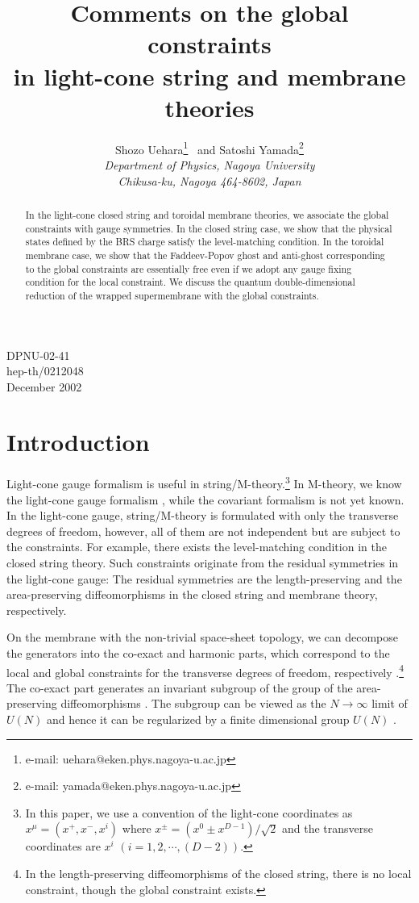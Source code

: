 \documentclass[12pt,a4paper]{article}
\title{Comments on the global constraints\\
in light-cone string and membrane theories}
\author{{\sc Shozo Uehara}\footnote{e-mail:
uehara@eken.phys.nagoya-u.ac.jp}~ and
{\sc Satoshi Yamada}\footnote{e-mail:
yamada@eken.phys.nagoya-u.ac.jp}\vspace{4mm}\\
{\sl Department of Physics, Nagoya University}\\
{\sl Chikusa-ku, Nagoya 464-8602, Japan}}
\date{}
\begin{document}
\maketitle
\vspace{-80mm}
\begin{flushright}
DPNU-02-41\\
hep-th/0212048\\
December 2002
\end{flushright}
\vspace{57mm}


\begin{abstract}
In the light-cone closed string and toroidal membrane theories,
we associate the global constraints with gauge symmetries.
In the closed string case, we show that the physical states defined by
the BRS charge satisfy the level-matching condition.
In the toroidal membrane case, we show that the Faddeev-Popov ghost and
anti-ghost corresponding to the global constraints are essentially
free even if we adopt any gauge fixing condition for the local
constraint. We discuss the quantum double-dimensional reduction of the
wrapped supermembrane with the global constraints.
\end{abstract}

\section{Introduction}
Light-cone gauge formalism is useful in string/M-theory.\footnote{In
this paper, we use a convention of the light-cone coordinates as
$x^\mu=(x^{+},x^{-},x^i)$ where $x^{\pm}=(x^0 \pm x^{D-1})/\sqrt{2}$
and the transverse coordinates are $x^i$ $(i=1,2,\cdots,(D-2))$. }
In M-theory, we know the light-cone gauge formalism \cite{BFSS},
while the covariant formalism is not yet known.
In the light-cone gauge, string/M-theory is formulated with only
the transverse degrees of freedom, however, all of them are not
independent but are subject to the constraints. For example, there
exists the level-matching condition in the closed string theory.
Such constraints originate from the residual symmetries in the
light-cone gauge: The residual symmetries are the length-preserving
and the area-preserving diffeomorphisms in the closed string and
membrane theory, respectively.

On the membrane with the non-trivial space-sheet topology, we can
decompose the generators into the co-exact and harmonic parts, which
correspond to the local and global constraints for the transverse
degrees of freedom, respectively \cite{FI,BPS,dWMN}.\footnote{In the
length-preserving diffeomorphisms of the closed string, there is no
local constraint, though the global constraint exists.}
The co-exact part generates an invariant subgroup of the group of
the area-preserving diffeomorphisms \cite{dWMN}.
The subgroup can be viewed as the $N\to\infty$ limit
of $U(N)$ and hence it can be regularized by a finite dimensional
group $U(N)$ \cite{Hop,dWHN}.
\end{document}
